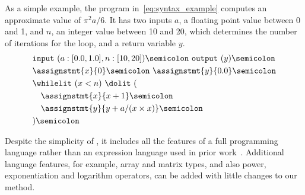As a simple example, the program in~\eqref{eq:syntax_example} computes an
approximate value of ${\pi^2 a}/6$.  It has two inputs $a$, a floating point
value between 0 and 1, and $n$, an integer value between 10 and 20, which
determines the number of iterations for the loop, and a return variable $y$.
\begin{equation}
    \begin{aligned}
        & \mathtt{input}~(a: [0.0, 1.0], n: [10, 20]) \semicolon~
          \mathtt{output}~(y) \semicolon \\
        & \assignstmt{x}{0} \semicolon~ \assignstmt{y}{0.0} \semicolon \\
        & \whilelit~(x < n)~\dolit~( \\
        & \quad \assignstmt{x}{x + 1} \semicolon \\
        & \quad \assignstmt{y}{y + a / (x \times x)} \semicolon \\
        & ) \semicolon
    \end{aligned}
    \label{eq:syntax_example}
\end{equation}

Despite the simplicity of \numimp{}, it includes all the features of a
full programming language rather than an expression language used in prior
work~\cite{soap}.  Additional language features, for example, array and matrix
types, and also power, exponentiation and logarithm operators, can be added
with little changes to our method.
